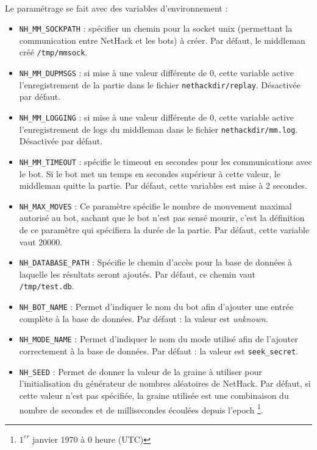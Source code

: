 \documentclass[a4paper,12pt]{article}
\begin{document}
\paragraph{}Le paramétrage se fait avec des variables d'environnement :
\begin{itemize}
\item \verb!NH_MM_SOCKPATH! : spécifier un chemin pour la socket unix
	(permettant la communication entre NetHack et les bots) à créer. Par
	défaut, le middleman créé {\verb|/tmp/mmsock|}.
\item \verb!NH_MM_DUPMSGS! : si mise à une valeur différente de 0, cette
	variable active l'enregistrement de la partie dans le fichier
	{\verb|nethackdir/replay|}. Désactivée par défaut.
\item \verb!NH_MM_LOGGING! : si mise à une valeur différente de 0, cette
	variable active l'enregistrement de logs du middleman dans le fichier
	{\verb|nethackdir/mm.log|}. Désactivée par défaut.
\item \verb!NH_MM_TIMEOUT! : spécifie le timeout en secondes pour les
	communications avec le bot. Si le bot met un temps en secondes supérieur à
	cette valeur, le middleman quitte la partie. Par défaut, cette variables
	est mise à 2 secondes.
\item \verb!NH_MAX_MOVES! :
  Ce paramètre spécifie le nombre de mouvement maximal autorisé au bot, sachant
  que le bot n'est pas sensé mourir, c'est la définition de ce paramètre qui
  spécifiera la durée de la partie. Par défaut, cette variable vaut 20000.
\item \verb!NH_DATABASE_PATH! :
  Spécifie le chemin d'accès pour la base de données à laquelle les résultats
  seront ajoutés. Par défaut, ce chemin vaut {\verb|/tmp/test.db|}.
\item \verb!NH_BOT_NAME! :
  Permet d'indiquer le nom du bot afin d'ajouter une entrée complète à la base
  de données. Par défaut : la valeur est \emph{unknown}.
\item \verb!NH_MODE_NAME! :
  Permet d'indiquer le nom du mode utilisé afin de l'ajouter correctement à la
  base de données. Par défaut : la valeur est {\verb|seek_secret|}.
\item \verb!NH_SEED! :
  Permet de donner la valeur de la graine à utiliser pour l'initialisation du
  générateur de nombres aléatoires de NetHack. Par défaut, si cette
  valeur n'est pas spécifiée, la graine utilisée est une combinaison du nombre
  de secondes et de millisecondes écoulées depuis l'epoch \footnote{$1^{er}$
  janvier 1970 à 0 heure (UTC)}.

\end{itemize}
\end{document}
